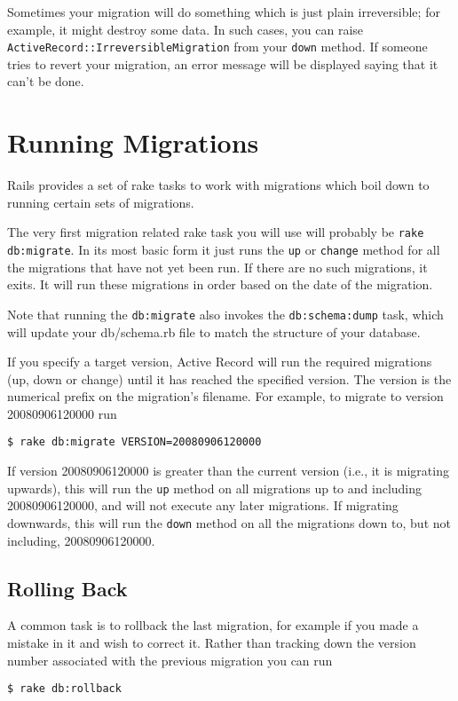 \documentclass[10pt]{book}
\begin{document}
Sometimes your migration will do something which is just plain irreversible; for example, it might destroy some data. In such cases, you can raise \texttt{ActiveRecord::IrreversibleMigration} from your \texttt{down} method. If someone tries to revert your migration, an error message will be displayed saying that it can’t be done.

\section{ Running Migrations}

Rails provides a set of rake tasks to work with migrations which boil down to running certain sets of migrations.

The very first migration related rake task you will use will probably be \texttt{rake db:migrate}. In its most basic form it just runs the \texttt{up} or \texttt{change} method for all the migrations that have not yet been run. If there are no such migrations, it exits. It will run these migrations in order based on the date of the migration.

Note that running the \texttt{db:migrate} also invokes the \texttt{db:schema:dump} task, which will update your db/schema.rb file to match the structure of your database.

If you specify a target version, Active Record will run the required migrations (up, down or change) until it has reached the specified version. The version is the numerical prefix on the migration’s filename. For example, to migrate to version 20080906120000 run
\begin{verbatim}
$ rake db:migrate VERSION=20080906120000
\end{verbatim}

If version 20080906120000 is greater than the current version (i.e., it is migrating upwards), this will run the \texttt{up} method on all migrations up to and including 20080906120000, and will not execute any later migrations. If migrating downwards, this will run the \texttt{down} method on all the migrations down to, but not including, 20080906120000.

\subsection{ Rolling Back}

A common task is to rollback the last migration, for example if you made a mistake in it and wish to correct it. Rather than tracking down the version number associated with the previous migration you can run
\begin{verbatim}
$ rake db:rollback
\end{verbatim}
\end{document}
